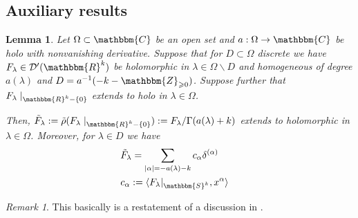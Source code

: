 \documentclass[12pt]{article}
\newcommand{\assign}{:=}
\newtheorem{lemma}[proposition]{Lemma}
\theoremstyle{remark}
\newtheorem{remark}[proposition]{Remark}
\begin{document}
\subsection{Auxiliary results}

\begin{lemma}
  \label{supp-R:lem-gelfand}Let $\Omega \subset \mathbbm{C}$ be an open set
  and $a : \Omega \rightarrow \mathbbm{C}$ be holo with nonvanishing
  derivative. Suppose that for $D \subset \Omega$ discrete we have
  $F_{\lambda} \in \mathcal{D}' (\mathbbm{R}^k)$ be holomorphic in $\lambda
  \in \Omega \backslash D$ and homogeneous of degree $a (\lambda)$ and $D =
  a^{- 1} (- k -\mathbbm{Z}_{\geqslant 0})$. Suppose further that $F_{\lambda}
  \mid_{\mathbbm{R}^k - \{ 0 \}}$ extends to holo in $\lambda \in \Omega$.
  
  Then, $\tilde{F}_{\lambda} : = \tilde{\rho} (F_{\lambda} \mid_{\mathbbm{R}^k
  - \{ 0 \}}) \assign F_{\lambda} / \Gamma (a (\lambda) + k)$ extends to
  holomorphic in $\lambda \in \Omega$. Moreover, for $\lambda \in D$ we
  have
  \begin{eqnarray}
    & \tilde{F}_{\lambda} = \sum_{| \alpha | = - a (\lambda) - k}
    c_{\alpha} \delta^{(\alpha)} &  \nonumber\\
    & c_{\alpha} \assign \langle F_{\lambda} |_{\mathbbm{S}^k}, x^{\alpha}
    \rangle &  \nonumber
  \end{eqnarray}
\end{lemma}

\begin{remark}
  This basically is a restatement of a discussion in
  {\cite[III.{\textsection}3.5]{gelfand1980distribution}}.
\end{remark}
\end{document}

